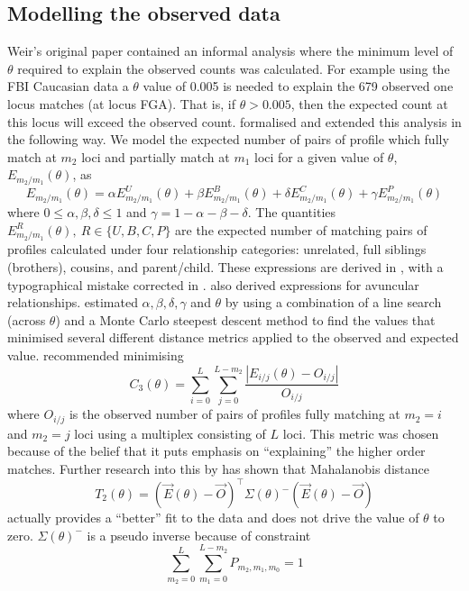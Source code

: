 \documentclass[a4paper,11pt]{article}
\begin{document}
\subsection[Modelling the data]{Modelling the observed data}
Weir's original paper \citep{weir2004} contained an informal analysis
where the minimum level of $\theta$ required to explain the observed
counts was calculated. For example using the FBI Caucasian data
\citep{budowle_1999} a $\theta$ value of 0.005 is needed to explain the
679 observed one locus matches (at locus FGA). That is, if
$\theta>0.005$, then the expected count at this locus will exceed the
observed count. \cite{curran2007} formalised and extended this
analysis in the following way. We model the expected number of pairs
of profile which fully match at $m_2$ loci and partially match at
$m_1$ loci for a given value of $\theta$, $E_{m_2/m_1}(\theta)$, as
\begin{equation*}
  \label{eq:1}
  E_{m_2/m_1}(\theta)=\alpha E_{m_2/m_1}^{U}(\theta)+ \beta
  E_{m_2/m_1}^{B}(\theta)+ \delta E_{m_2/m_1}^{C}(\theta)+ \gamma E_{m_2/m_1}^{P}(\theta)
\end{equation*}
where $0\le\alpha,\beta,\delta\le 1$ and
$\gamma=1-\alpha-\beta-\delta$. The quantities
$E_{m_2/m_1}^R(\theta),~ R\in\{U,B,C,P\}$ are the expected number of
matching pairs of profiles calculated under four relationship
categories: unrelated, full siblings (brothers), cousins, and
parent/child. These expressions are derived in \cite{curran2007},
with a typographical mistake corrected in
\citet{curran2010}. \citet{tvedebrink2010} also derived expressions
for avuncular relationships. \citet{curran2007} estimated
$\alpha,\beta,\delta,\gamma$ and $\theta$ by using a combination of a
line search (across $\theta$) and a Monte Carlo steepest descent
method to find the values that minimised several different distance
metrics applied to the observed and expected value. \citet{curran2007}
recommended minimising
\begin{equation*}
  \label{eq:2}
  C_3(\theta) = \sum_{i=0}^{L}\sum_{j=0}^{L-m_2}\frac{|E_{i/j}(\theta)-O_{i/j}|}{O_{i/j}}
\end{equation*}
where $O_{i/j}$ is the observed number of pairs of profiles fully
matching at $m_2=i$ and $m_2=j$ loci using a multiplex consisting of
$L$ loci. This metric was chosen because of the belief that it puts
emphasis on ``explaining'' the higher order matches. Further research
into this by \citet{tvedebrink2010,tvedebrink2011} has shown that Mahalanobis
distance
\begin{equation*}
  \label{eq:3}
  T_2(\theta) = \left(\vec{E}(\theta)-\vec{O}\right)^\top\Sigma(\theta)^{-}\left(\vec{E}(\theta)-\vec{O}\right)
\end{equation*}
actually provides a ``better'' fit to the data and does not drive the
value of $\theta$ to zero. $\Sigma(\theta)^{-}$ is a pseudo
inverse because of constraint
\[
\sum_{m_2=0}^{L}\sum_{m_1=0}^{L-m_2}P_{m_{2},m_{1},m_{0}}=1
\]
\end{document}

